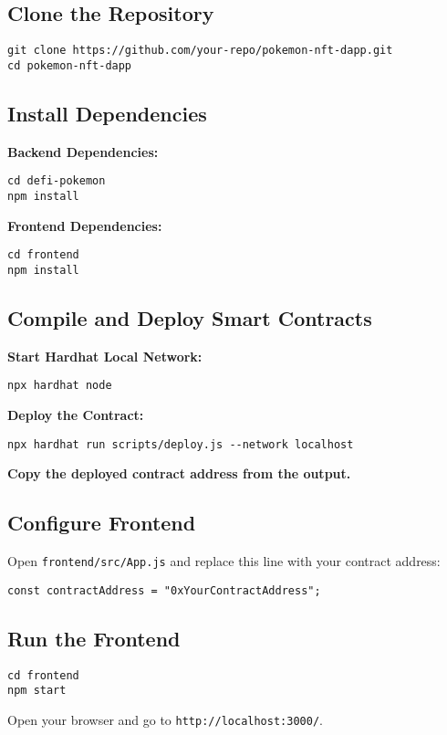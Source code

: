 \documentclass{article}
\begin{document}
\subsection{Clone the Repository}
\begin{lstlisting}
git clone https://github.com/your-repo/pokemon-nft-dapp.git
cd pokemon-nft-dapp
\end{lstlisting}

\subsection{Install Dependencies}
\textbf{Backend Dependencies:}
\begin{lstlisting}
cd defi-pokemon
npm install
\end{lstlisting}
\textbf{Frontend Dependencies:}
\begin{lstlisting}
cd frontend
npm install
\end{lstlisting}

\subsection{Compile and Deploy Smart Contracts}
\textbf{Start Hardhat Local Network:}
\begin{lstlisting}
npx hardhat node
\end{lstlisting}
\textbf{Deploy the Contract:}
\begin{lstlisting}
npx hardhat run scripts/deploy.js --network localhost
\end{lstlisting}
\textbf{Copy the deployed contract address from the output.}

\subsection{Configure Frontend}
Open \texttt{frontend/src/App.js} and replace this line with your contract address:
\begin{lstlisting}
const contractAddress = "0xYourContractAddress";
\end{lstlisting}

\subsection{Run the Frontend}
\begin{lstlisting}
cd frontend
npm start
\end{lstlisting}
Open your browser and go to \texttt{http://localhost:3000/}.
\end{document}
